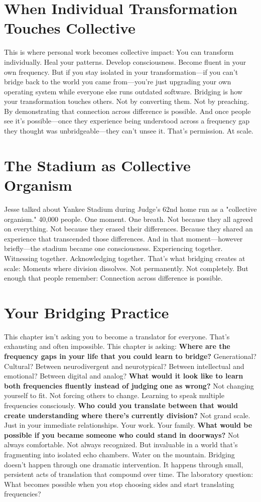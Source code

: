 \section{When Individual Transformation Touches Collective}

This is where personal work becomes collective impact:
You can transform individually. Heal your patterns. Develop consciousness. Become fluent in your own frequency.
But if you stay isolated in your transformation—if you can't bridge back to the world you came from—you're just upgrading your own operating system while everyone else runs outdated software.
Bridging is how your transformation touches others.
Not by converting them. Not by preaching. By demonstrating that connection across difference is possible.
And once people see it's possible—once they experience being understood across a frequency gap they thought was unbridgeable—they can't unsee it.
That's permission. At scale.

\section{The Stadium as Collective Organism}

Jesse talked about Yankee Stadium during Judge's 62nd home run as a "collective organism."
40,000 people. One moment. One breath.
Not because they all agreed on everything. Not because they erased their differences. Because they shared an experience that transcended those differences.
And in that moment—however briefly—the stadium became one consciousness. Experiencing together. Witnessing together. Acknowledging together.
That's what bridging creates at scale:
Moments where division dissolves. Not permanently. Not completely. But enough that people remember: Connection across difference is possible.

\section{Your Bridging Practice}

This chapter isn't asking you to become a translator for everyone. That's exhausting and often impossible.
This chapter is asking:
\textbf{Where are the frequency gaps in your life that you could learn to bridge?}
Generational? Cultural? Between neurodivergent and neurotypical? Between intellectual and emotional? Between digital and analog?
\textbf{What would it look like to learn both frequencies fluently instead of judging one as wrong?}
Not changing yourself to fit. Not forcing others to change. Learning to speak multiple frequencies consciously.
\textbf{Who could you translate between that would create understanding where there's currently division?}
Not grand scale. Just in your immediate relationships. Your work. Your family.
\textbf{What would be possible if you became someone who could stand in doorways?}
Not always comfortable. Not always recognized. But invaluable in a world that's fragmenting into isolated echo chambers.
Water on the mountain.
Bridging doesn't happen through one dramatic intervention. It happens through small, persistent acts of translation that compound over time.
The laboratory question:
What becomes possible when you stop choosing sides and start translating frequencies?

